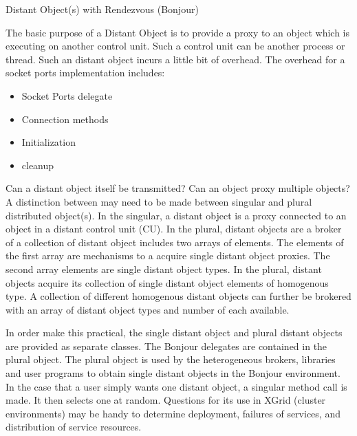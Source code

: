 Distant Object(s) with Rendezvous (Bonjour) 

The basic purpose of a Distant Object is to provide a proxy to an object which is executing on another control unit.   Such a control unit can be another process or thread.  Such an distant object incurs a little bit of overhead.  The overhead for a %
socket ports implementation includes:
\begin{itemize}
\item Socket Ports delegate
\item Connection methods
\item Initialization
\item cleanup
\end{itemize}

Can a distant object itself be transmitted?  Can an object proxy multiple objects?   A distinction between may need to be made between singular and plural distributed object(s).  In the singular, a distant object is a proxy connected to an object in a distant control unit (CU).  In the plural, distant objects are a broker of a collection of distant object includes two arrays of elements.  The elements of the first array are mechanisms to a acquire single distant object proxies.   The second array elements are single distant object types.  In the plural, distant objects acquire its collection of single distant object elements of homogenous type.  
A collection of different homogenous distant objects can further be brokered with an array of distant object types and number of each available. 

In order make this practical, the single distant object and plural distant objects are provided as separate classes.   The Bonjour delegates are contained in the plural object.   The plural object is used by the heterogeneous brokers, libraries and user programs to obtain single distant objects in the Bonjour environment.  In the case that a user simply wants one distant object, a singular method call is made.  It then selects one at random.    Questions for its use in XGrid (cluster environments) may be handy to determine deployment, failures of services, and distribution of service resources.  

